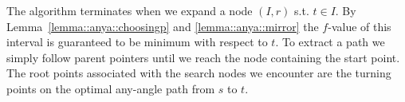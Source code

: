 The algorithm terminates when we expand a node $(I, r)$ s.t.
$t \in I$. By Lemma~\ref{lemma::anya::choosingp} and \ref{lemma::anya::mirror} 
the $f$-value of this
interval is guaranteed to be minimum with respect to $t$.
To extract a path we simply follow parent pointers until we
reach the node containing the start point.
The root points associated with the search nodes we encounter
are the turning points on the optimal any-angle path from 
$s$ to $t$. 

